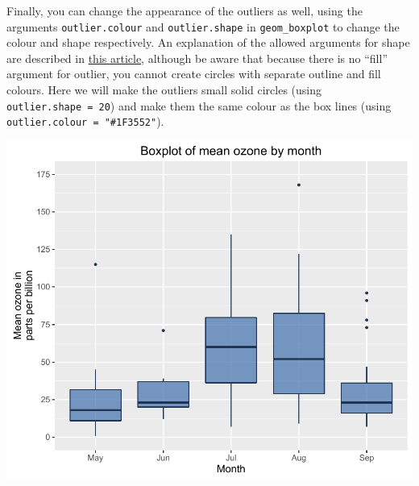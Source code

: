 \documentclass[]{article}
\newenvironment{Shaded}{\begin{snugshade}}{\end{snugshade}}
\newcommand{\KeywordTok}[1]{\textcolor[rgb]{0.13,0.29,0.53}{\textbf{{#1}}}}
\newcommand{\DataTypeTok}[1]{\textcolor[rgb]{0.13,0.29,0.53}{{#1}}}
\newcommand{\DecValTok}[1]{\textcolor[rgb]{0.00,0.00,0.81}{{#1}}}
\newcommand{\FloatTok}[1]{\textcolor[rgb]{0.00,0.00,0.81}{{#1}}}
\newcommand{\CharTok}[1]{\textcolor[rgb]{0.31,0.60,0.02}{{#1}}}
\newcommand{\StringTok}[1]{\textcolor[rgb]{0.31,0.60,0.02}{{#1}}}
\newcommand{\NormalTok}[1]{{#1}}
\begin{document}
Finally, you can change the appearance of the outliers as well, using
the arguments \texttt{outlier.colour} and \texttt{outlier.shape} in
\texttt{geom\_boxplot} to change the colour and shape respectively. An
explanation of the allowed arguments for shape are described in
\href{http://sape.inf.usi.ch/quick-reference/ggplot2/shape}{this
article}, although be aware that because there is no ``fill'' argument
for outlier, you cannot create circles with separate outline and fill
colours. Here we will make the outliers small solid circles (using
\texttt{outlier.shape\ =\ 20}) and make them the same colour as the box
lines (using \texttt{outlier.colour\ =\ "\#1F3552"}).

\begin{Shaded}
\end{Shaded}

\begin{center}\includegraphics{10_Boxplots_pdf/box_9-1} \end{center}
\end{document}
